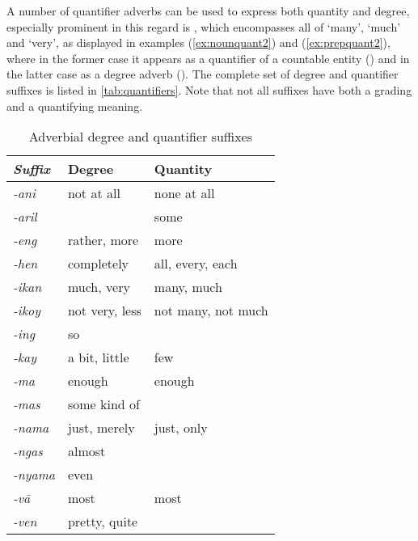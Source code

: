 A number of quantifier adverbs can be used to express both quantity and 
degree, especially prominent in this regard is , which 
encompasses all of `many', `much' and `very', as displayed in examples 
(\ref{ex:nounquant2}) and (\ref{ex:prepquant2}), where in the former case it 
appears as a quantifier of a countable entity 
() and in the latter case as a 
degree adverb (). The complete set of 
degree and quantifier suffixes is listed in \autoref{tab:quantifiers}. Note 
that not all suffixes have both a grading and a quantifying meaning.

\begin{table}[tp]\centering
\caption{Adverbial degree and quantifier suffixes}
\begin{tabu} to .75
\toprule\tableheaderfont
Suffix
	& Degree
	& Quantity
	\\

\toprule
	
-ani %
	& not at all
	& none at all
	\\

-aril %
	& 
	& some
	\\

-eng %
	& rather, more
	& more
	\\
	
-hen %
	& completely
	& all, every, each
	\\

-ikan %
	& much, very
	& many, much
	\\
	
-ikoy %
	& not very, less
	& not many, not much
	\\
	
-ing %
	& so
	&
	\\
	
-kay %
	& a bit, little
	& few
	\\

-ma %
	& enough
	& enough
	\\

-mas %
	& some kind of
	&
	\\

-nama %
	& just, merely
	& just, only
	\\
	
-ngas %
	& almost
	&
	\\

-nyama %
	& even
	&
	\\
	
-vā %
	& most
	& most
	\\

-ven %
	& pretty, quite
	&
	\\

\bottomrule
\end{tabu}
\label{tab:quantifiers}
\end{table}

